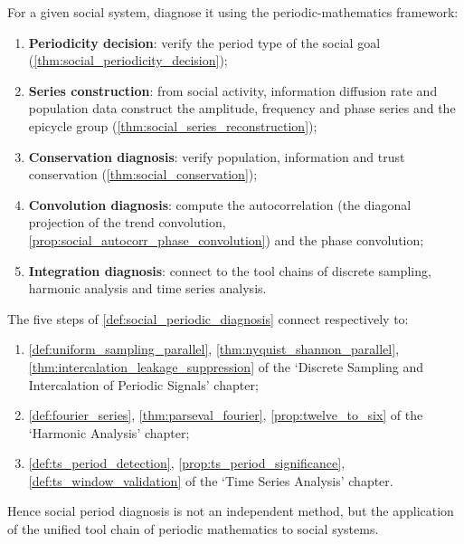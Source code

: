 \begin{definition}\label{def:social_periodic_diagnosis}
For a given social system, diagnose it using the periodic-mathematics framework:
\begin{enumerate}[label=(\roman*)]
    \item \textbf{Periodicity decision}: verify the period type of the social goal (\cref{thm:social_periodicity_decision});
    \item \textbf{Series construction}: from social activity, information diffusion rate and population data construct the amplitude, frequency and phase series and the epicycle group (\cref{thm:social_series_reconstruction});
    \item \textbf{Conservation diagnosis}: verify population, information and trust conservation (\cref{thm:social_conservation});
    \item \textbf{Convolution diagnosis}: compute the autocorrelation (the diagonal projection of the trend convolution, \cref{prop:social_autocorr_phase_convolution}) and the phase convolution;
    \item \textbf{Integration diagnosis}: connect to the tool chains of discrete sampling, harmonic analysis and time series analysis.
\end{enumerate}
\end{definition}

\begin{theorem}\label{thm:social_diagnosis_integration}
The five steps of \cref{def:social_periodic_diagnosis} connect respectively to:
\begin{enumerate}[label=(\roman*)]
    \item \cref{def:uniform_sampling_parallel}, \cref{thm:nyquist_shannon_parallel}, \cref{thm:intercalation_leakage_suppression} of the `Discrete Sampling and Intercalation of Periodic Signals' chapter;
    \item \cref{def:fourier_series}, \cref{thm:parseval_fourier}, \cref{prop:twelve_to_six} of the `Harmonic Analysis' chapter;
    \item \cref{def:ts_period_detection}, \cref{prop:ts_period_significance}, \cref{def:ts_window_validation} of the `Time Series Analysis' chapter.
\end{enumerate}
Hence social period diagnosis is not an independent method, but the application of the unified tool chain of periodic mathematics to social systems.
\end{theorem}

